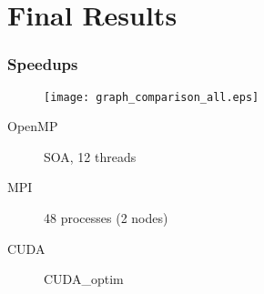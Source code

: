 \section{Final Results}


\begin{frame}
	\frametitle{Speedups}
	\begin{figure}
		\centering
		\texttt{[image: graph\_comparison\_all.eps]}
	\end{figure}
	\begin{description}
		\item [OpenMP] SOA, 12 threads
		\item [MPI] 48 processes (2 nodes)
		\item [CUDA] CUDA\_optim
	\end{description}
\end{frame}
